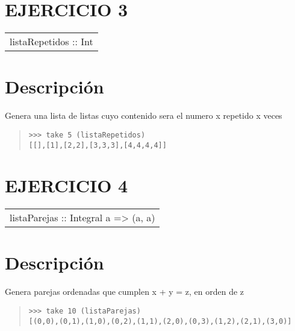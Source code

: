 \section{EJERCICIO 3}
\begin{haddockdesc}
\item[\begin{tabular}{@{}l}
listaRepetidos :: {\char 91}{\char 91}Int{\char 93}{\char 93}
\end{tabular}]
{\haddockbegindoc
\section*{Descripción}
Genera una lista de listas cuyo contenido sera el numero x repetido x veces\par
\begin{quote}
{\haddockverb\begin{verbatim}
>>> take 5 (listaRepetidos)
[[],[1],[2,2],[3,3,3],[4,4,4,4]]

\end{verbatim}}
\end{quote}}
\end{haddockdesc}
\section{EJERCICIO 4}
\begin{haddockdesc}
\item[\begin{tabular}{@{}l}
listaParejas :: Integral a => {\char 91}(a, a){\char 93}
\end{tabular}]
{\haddockbegindoc
\section*{Descripción}
Genera parejas ordenadas que cumplen x + y = z, en orden de z\par
\begin{quote}
{\haddockverb\begin{verbatim}
>>> take 10 (listaParejas)
[(0,0),(0,1),(1,0),(0,2),(1,1),(2,0),(0,3),(1,2),(2,1),(3,0)]

\end{verbatim}}
\end{quote}}
\end{haddockdesc}
